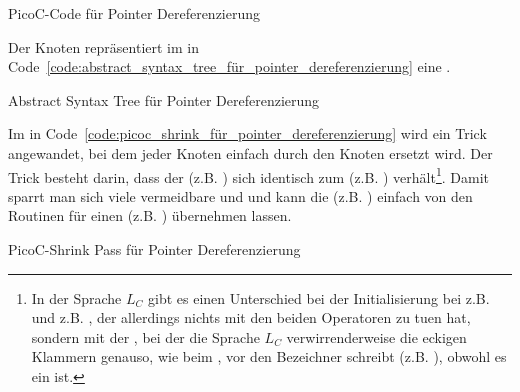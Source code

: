 \begin{code}
  \centering
  \caption{PicoC-Code für Pointer Dereferenzierung}
  \label{code:picoc_code_für_pointer_dereferenzierung}
\end{code}

Der Knoten  repräsentiert im  in Code~\ref{code:abstract_syntax_tree_für_pointer_dereferenzierung} eine  .

\begin{code}
  \centering
  \caption{Abstract Syntax Tree für Pointer Dereferenzierung}
  \label{code:abstract_syntax_tree_für_pointer_dereferenzierung}
\end{code}

Im  in Code~\ref{code:picoc_shrink_für_pointer_dereferenzierung} wird ein Trick angewandet, bei dem jeder Knoten  einfach durch den Knoten  ersetzt wird. Der Trick besteht darin, dass der  (z.B. ) sich identisch zum  (z.B. ) verhält\footnote{In der Sprache $L_{C}$ gibt es einen Unterschied bei der Initialisierung bei z.B.  und z.B. , der allerdings nichts mit den beiden Operatoren zu tuen hat, sondern mit der , bei der die Sprache $L_{C}$ verwirrenderweise die eckigen Klammern \smalltt{[]} genauso, wie beim , vor den Bezeichner schreibt (z.B. ), obwohl es ein  ist.}. Damit sparrt man sich viele vermeidbare  und  und kann die  (z.B. ) einfach von den Routinen für einen  (z.B. ) übernehmen lassen.

\begin{code}
  \centering
  \caption{PicoC-Shrink Pass für Pointer Dereferenzierung}
  \label{code:picoc_shrink_für_pointer_dereferenzierung}
\end{code}

